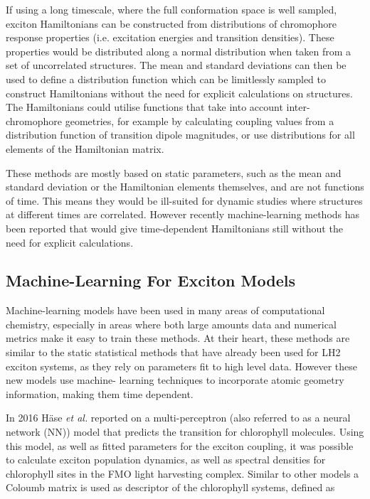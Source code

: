 If using a long timescale, where the full conformation space is well sampled, exciton
Hamiltonians can be constructed from distributions of chromophore response properties
(i.e. excitation energies and transition densities). These properties would be distributed
along a normal distribution when taken from a set of uncorrelated structures. The
mean and standard deviations can then be used to define a distribution function 
which can be limitlessly sampled to construct Hamiltonians without the need for 
explicit calculations on structures. The Hamiltonians could utilise functions that 
take into account inter-chromophore geometries, for example by calculating coupling
values from a distribution function of transition dipole magnitudes, or use distributions
for all elements of the Hamiltonian matrix.

These methods are mostly based on static parameters, such as the mean and standard
deviation or the Hamiltonian elements themselves, and are not functions of time.
This means they would be ill-suited for dynamic studies where structures at different
times are correlated. However recently machine-learning methods has been reported
that would give time-dependent Hamiltonians still without the need for explicit
calculations.

\subsection{Machine-Learning For Exciton Models}
\label{subsec:machine_learning} 

Machine-learning models have been used in many areas of computational chemistry,
especially in areas where both large amounts data and numerical metrics make it 
easy to train these methods. At their heart, these methods are similar to the static
statistical methods that have already been used for LH2 exciton systems, as they
rely on parameters fit to high level data. However these new models use machine-
learning techniques to incorporate atomic geometry information, making them time
dependent.

In 2016 H\"{a}se \emph{et al.} reported on a multi-perceptron (also referred to
as a neural network (NN)) model that predicts the \Qy transition for chlorophyll
molecules. Using this model, as well as fitted parameters for the exciton coupling,
it was possible to calculate exciton population dynamics, as well as spectral densities
for chlorophyll sites in the FMO light harvesting complex. Similar to other models
a Coloumb matrix is used as descriptor of the chlorophyll systems, defined as 

